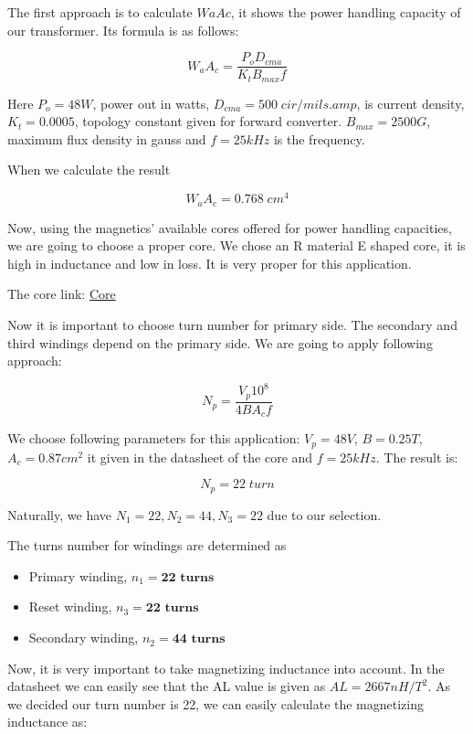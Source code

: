 The first approach is to calculate $WaAc$, it shows the power handling capacity of our transformer. Its formula is as follows:

\begin{equation}
    W_a A_c = \dfrac{P_o D_{cma}}{K_t B_{max} f}
\end{equation}

Here $P_o = 48W$, power out in watts, $D_{cma} = 500 \; cir/mils.amp$, is current density, $K_t = 0.0005$, topology constant given for forward converter. $B_{max} = 2500 G$, maximum flux density in gauss and $f=25kHz$ is the frequency. 

When we calculate the result

$$ W_a A_c = 0.768 \; cm^4$$

Now, using the magnetics' available cores offered for power handling capacities, we are going to choose a proper core. We chose an R material E shaped core, it is high in inductance and low in loss. It is very proper for this application.

The core link: \href{https://www.mag-inc.com/Media/Magnetics/Datasheets/0R43515EC.pdf}{Core}

Now it is important to choose turn number for primary side. The secondary and third windings depend on the primary side. We are going to apply following approach:

\begin{equation}
    N_p = \dfrac{V_p 10^8}{4BA_c f}
\end{equation}

We choose following parameters for this application: $V_p = 48V$, $B = 0.25 T $, $A_c = 0.87 cm^2$ it given in the datasheet of the core and $f=25kHz$. The result is:

$$N_p = 22 \; turn$$

Naturally, we have $N_1 = 22, N_2 = 44, N_3 = 22$ due to our selection.


The turns number for windings are determined as 
\begin{itemize}
    \item Primary winding, $n_1 = \textbf{22 turns}$
    \item Reset winding, $n_3 = \textbf{22 turns}$
    \item Secondary winding, $n_2 = \textbf{44 turns}$
\end{itemize}

Now, it is very important to take magnetizing inductance into account. In the datasheet we can easily see that the AL value is given as $AL = 2667 nH/T^2$. As we decided our turn number is 22, we can easily calculate the magnetizing inductance as:

